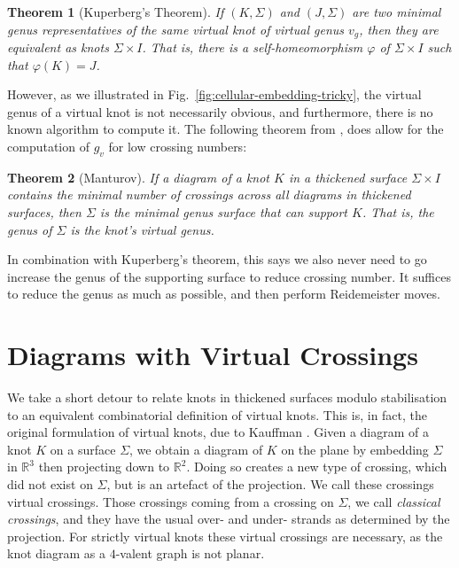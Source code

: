 \documentclass[12pt]{report}
\newcommand{\R}{\mathbb{R}}
\newtheorem*{theorem}{Theorem}
\theoremstyle{upright}
\begin{document}
\begin{theorem}[Kuperberg's Theorem]
If $(K, \Sigma)$ and $(J, \Sigma)$ are two minimal genus representatives of the same virtual knot of virtual genus $v_{g}$, then they are equivalent as knots $\Sigma \times I$. That is, there is a self-homeomorphism $\varphi$ of $\Sigma \times I$ such that $\varphi(K) = J$.
\end{theorem}

However, as we illustrated in Fig.~\ref{fig:cellular-embedding-tricky}, the virtual genus of a virtual knot is not necessarily obvious, and furthermore, there is no known algorithm to compute it. The following theorem from \cite{parity-and-projection}, does allow for the computation of $g_{v}$ for low crossing numbers:

\begin{theorem}[Manturov]
	If a diagram of a knot $K$ in a thickened surface $\Sigma \times I$ contains the minimal number of crossings across all diagrams in thickened surfaces, then $\Sigma$ is the minimal genus surface that can support $K$. That is, the genus of $\Sigma$ is the knot's virtual genus.
\end{theorem}
In combination with Kuperberg's theorem, this says we also never need to go increase the genus of the supporting surface to reduce crossing number. It suffices to reduce the genus as much as possible, and then perform Reidemeister moves.


\section{Diagrams with Virtual Crossings}

We take a short detour to relate knots in thickened surfaces modulo stabilisation to an equivalent combinatorial definition of virtual knots. This is, in fact, the original formulation of virtual knots, due to Kauffman \cite{virtual-knot-theory}. Given a diagram of a knot $K$ on a surface $\Sigma$, we obtain a diagram of $K$ on the plane by embedding $\Sigma$ in $\R^{3}$ then projecting down to $\R^{2}$. Doing so creates a new type of crossing, which did not exist on $\Sigma$, but is an artefact of the projection. We call these crossings virtual crossings. Those crossings coming from a crossing on $\Sigma$, we call \textit{classical crossings}, and they have the usual over- and under- strands as determined by the projection. For strictly virtual knots these virtual crossings are necessary, as the knot diagram as a $4$-valent graph is not planar.
\end{document}
